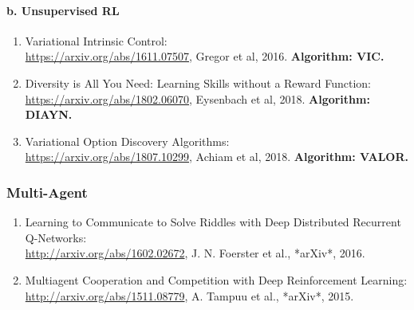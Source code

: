 \documentclass[lang=cn,11pt,a4paper]{eleganttemplate}
\begin{document}
\paragraph{b. Unsupervised RL}
\begin{enumerate}
    \item Variational Intrinsic Control:\\ \href{https://arxiv.org/abs/1611.07507}{https://arxiv.org/abs/1611.07507}, Gregor et al, 2016. \textbf{Algorithm: VIC.}
    \item Diversity is All You Need: Learning Skills without a Reward Function:\\ \href{https://arxiv.org/abs/1802.06070}{https://arxiv.org/abs/1802.06070}, Eysenbach et al, 2018. \textbf{Algorithm: DIAYN.}
    \item Variational Option Discovery Algorithms:\\ \href{https://arxiv.org/abs/1807.10299}{https://arxiv.org/abs/1807.10299}, Achiam et al, 2018. \textbf{Algorithm: VALOR.}
\end{enumerate}

\subsubsection{Multi-Agent}
\begin{enumerate}
    \item Learning to Communicate to Solve Riddles with Deep Distributed Recurrent Q-Networks:\\ \href{http://arxiv.org/abs/1602.02672}{http://arxiv.org/abs/1602.02672}, J. N. Foerster et al., *arXiv*, 2016.
    \item Multiagent Cooperation and Competition with Deep Reinforcement Learning:\\ \href{http://arxiv.org/abs/1511.08779}{http://arxiv.org/abs/1511.08779}, A. Tampuu et al., *arXiv*, 2015.
\end{enumerate}
\end{document}
